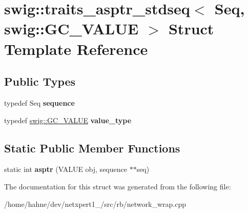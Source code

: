 \hypertarget{structswig_1_1traits__asptr__stdseq_3_01Seq_00_01swig_1_1GC__VALUE_01_4}{}\section{swig\+:\+:traits\+\_\+asptr\+\_\+stdseq$<$ Seq, swig\+:\+:G\+C\+\_\+\+V\+A\+L\+UE $>$ Struct Template Reference}
\label{structswig_1_1traits__asptr__stdseq_3_01Seq_00_01swig_1_1GC__VALUE_01_4}
\subsection*{Public Types}
\begin{DoxyCompactItemize}
\item 
typedef Seq {\bfseries sequence}\hypertarget{structswig_1_1traits__asptr__stdseq_3_01Seq_00_01swig_1_1GC__VALUE_01_4_af7fffcad40c6aa249c2c88e96e1df6e9}{}\label{structswig_1_1traits__asptr__stdseq_3_01Seq_00_01swig_1_1GC__VALUE_01_4_af7fffcad40c6aa249c2c88e96e1df6e9}

\item 
typedef \hyperlink{classswig_1_1GC__VALUE}{swig\+::\+G\+C\+\_\+\+V\+A\+L\+UE} {\bfseries value\+\_\+type}\hypertarget{structswig_1_1traits__asptr__stdseq_3_01Seq_00_01swig_1_1GC__VALUE_01_4_a6cefbcffca112dd0b3a1ea9b36815992}{}\label{structswig_1_1traits__asptr__stdseq_3_01Seq_00_01swig_1_1GC__VALUE_01_4_a6cefbcffca112dd0b3a1ea9b36815992}

\end{DoxyCompactItemize}
\subsection*{Static Public Member Functions}
\begin{DoxyCompactItemize}
\item 
static int {\bfseries asptr} (V\+A\+L\+UE obj, sequence $\ast$$\ast$seq)\hypertarget{structswig_1_1traits__asptr__stdseq_3_01Seq_00_01swig_1_1GC__VALUE_01_4_aeb7bcfd90262649468f0891fbff719b4}{}\label{structswig_1_1traits__asptr__stdseq_3_01Seq_00_01swig_1_1GC__VALUE_01_4_aeb7bcfd90262649468f0891fbff719b4}

\end{DoxyCompactItemize}


The documentation for this struct was generated from the following file\+:\begin{DoxyCompactItemize}
\item 
/home/hahne/dev/netxpert1\+\_/src/rb/network\+\_\+wrap.\+cpp\end{DoxyCompactItemize}
